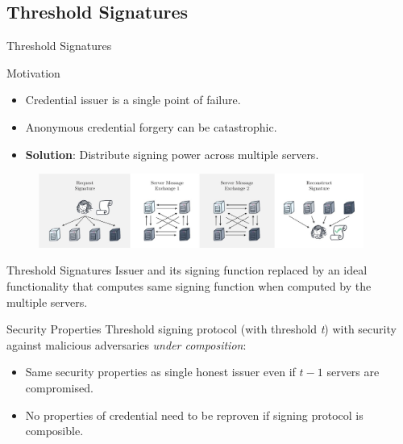 \documentclass[
	xcolor={svgnames},
	hyperref={pagebackref,bookmarks},
	aspectratio=43,
]{beamer}
\begin{document}
\subsection{Threshold Signatures}
\begin{frame}{Threshold Signatures}
	\begin{block}{Motivation}
		\begin{itemize}
			\item Credential issuer is a single point of failure.
			\item Anonymous credential forgery can be catastrophic.
			\item \textbf{Solution}: Distribute signing power across multiple servers.
		\end{itemize}
	\end{block}
	\vspace{4mm}
	\begin{figure}
		\centering
		\includegraphics[width=0.95\textwidth]{threshold-signature.jpeg}
	\end{figure}
\end{frame}

\begin{frame}{Threshold Signatures}
	\vspace{-7mm}
	Issuer and its signing function replaced by an ideal functionality that computes same signing function when computed by the multiple servers.
	\vspace{4mm}
	\begin{block}{Security Properties}
		Threshold signing protocol (with threshold \textit{t}) with security against malicious adversaries \textit{under composition}\footnotemark:
		\begin{itemize}
			\item Same security properties as single honest issuer even if $t-1$ servers are compromised.
			\item No properties of credential need to be reproven if signing protocol is composible.
		\end{itemize}
	\end{block}
\end{frame}
\end{document}

